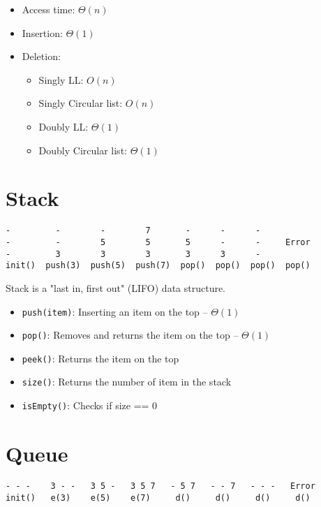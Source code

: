 \begin{itemize}
  \item Access time: $\Theta (n)$
  \item Insertion: $\Theta(1)$
  \item Deletion:
    \begin{itemize}
      \item Singly LL: $O(n)$
      \item Singly Circular list: $O(n)$
      \item Doubly LL: $\Theta (1)$
      \item Doubly Circular list: $\Theta (1)$
    \end{itemize}
\end{itemize}

\section{Stack}

\begin{verbatim}
-         -        -        7       -      -      -
-         -        5        5       5      -      -     Error
-         3        3        3       3      3      -
init()  push(3)  push(5)  push(7)  pop()  pop()  pop()  pop()
\end{verbatim}

\noindent Stack is a "last in, first out" (LIFO) data structure.

\begin{itemize}
  \item \texttt{push(item)}: Inserting an item on the top -- $\Theta (1)$
  \item \texttt{pop()}: Removes and returns the item on the top -- $\Theta (1)$
  \item \texttt{peek()}: Returns the item on the top
  \item \texttt{size()}: Returns the number of item in the stack
  \item \texttt{isEmpty()}: Checks if size == 0
\end{itemize}

\section{Queue}

\begin{verbatim}
- - -    3 - -   3 5 -   3 5 7   - 5 7   - - 7   - - -   Error
init()   e(3)    e(5)    e(7)     d()     d()     d()     d()
\end{verbatim}

